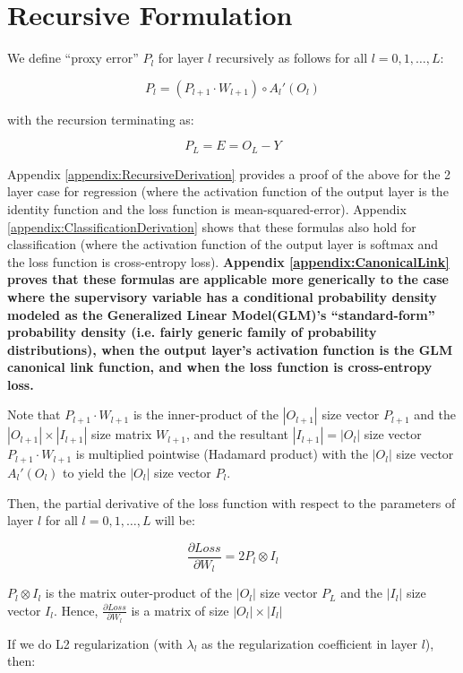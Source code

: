 \documentclass[10pt]{amsart}
\begin{document}
\section{Recursive Formulation}

We define ``proxy error'' $P_l$ for layer $l$ recursively as follows for all $l = 0, 1, \ldots, L$:

$$P_l = (P_{l+1} \cdot W_{l+1}) \circ A_l'(O_l)$$

with the recursion terminating as:

$$P_L = E = O_L - Y$$

Appendix \ref{appendix:RecursiveDerivation} provides a proof of the above for the 2 layer case for regression (where the activation function of the output layer is the identity function and the loss function is mean-squared-error). Appendix \ref{appendix:ClassificationDerivation} shows that these formulas also hold for classification (where the activation function of the output layer is softmax and the loss function is cross-entropy loss). {\bf Appendix \ref{appendix:CanonicalLink} proves that these formulas are applicable more generically to the case where the supervisory variable has a conditional probability density modeled as the Generalized Linear Model(GLM)'s ``standard-form'' probability density (i.e. fairly generic family of probability distributions), when the output layer's activation function is the GLM canonical link function, and when the loss function is cross-entropy loss.}

Note that $P_{l+1} \cdot W_{l+1}$ is the inner-product of the $| O_{l+1} |$ size vector $P_{l+1}$ and the $| O_{l+1} | \times | I_{l+1} |$ size matrix $W_{l+1}$, and the resultant $| I_{l+1} | = | O_l |$ size vector $P_{l+1} \cdot W_{l+1}$ is multiplied pointwise (Hadamard product) with the $| O_l |$ size vector $A_l'(O_l)$ to yield the $| O_l |$ size vector $P_l$.

Then, the partial derivative of the loss function with respect to the parameters of layer $l$ for all $l = 0, 1, \ldots, L$ will be:

$$ \frac {\partial Loss}{\partial W_l} = 2 P_l \otimes I_l$$

$P_l \otimes I_l$ is the matrix outer-product of the $| O_l |$ size vector $P_L$ and the $| I_l |$ size vector $I_l$. Hence, $\frac{\partial Loss}{\partial W_l}$ is a matrix of size $| O_l | \times | I_l |$

If we do L2 regularization (with $\lambda_l$ as the regularization coefficient in layer $l$), then:
\end{document}
